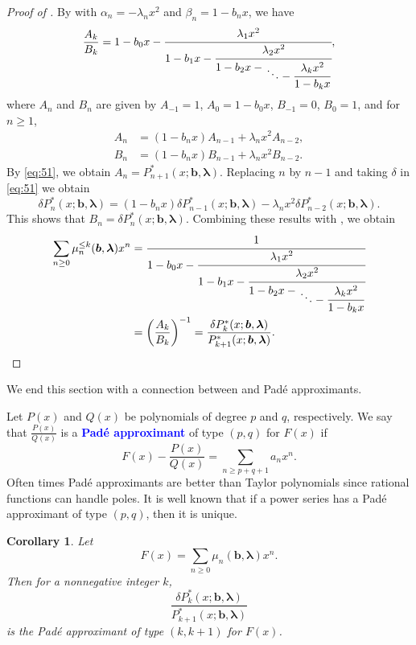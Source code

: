 \documentclass[oneside]{book}
\numberwithin{equation}{section}
\newtheorem{cor}[thm]{Corollary}
\theoremstyle{definition}
\renewcommand\vec[1]{\bm{#1}}
\newcommand\vb{\vec{b}}
\newcommand\vla{\vec{\lambda}}
\renewcommand\emph[1]{\textcolor{blue}{\bf #1}}
\begin{document}
\begin{proof}[Proof of ]
  By  with
  \( \alpha_n = -\lambda_n x^2 \)
  and \( \beta_n = 1-b_nx \), we have
  \[
    \frac{A_k}{B_k} = 1-b_0x- \cfrac{\lambda_1x^2}{ 1-b_1x-
      \cfrac{\lambda_2x^2}{ 1-b_2x-
        \genfrac{}{}{0pt}{1}{}{\displaystyle\ddots -
          \cfrac{\lambda_kx^2}{1-b_kx}}} },
  \]
  where \( A_n \) and \( B_n \) are given by
  \( A_{-1} = 1 \), \( A_0=1-b_0x \),
  \( B_{-1} = 0 \), \( B_0=1 \), and for \( n\ge1 \),
  \begin{align*}
    A_n &= (1-b_nx) A_{n-1} + \lambda_n x^2 A_{n-2},\\
    B_n &= (1-b_nx) B_{n-1} + \lambda_n x^2 B_{n-2}.
  \end{align*}
  By \eqref{eq:51}, we obtain \( A_n = P^*_{n+1}(x;\vb,\vla) \).
  Replacing \( n \) by \( n-1 \) and taking \( \delta \) in \eqref{eq:51} we obtain
  \[
  \delta P^*_{n}(x;\vb,\vla) = (1-b_{n}x) \delta P^*_{n-1}(x;\vb,\vla) - \lambda_{n} x^2  \delta P^*_{n-2}(x;\vb,\vla).
\]
This shows that \( B_n = \delta P^*_n(x;\vb,\vla) \). Combining these
results with , we obtain
\begin{align*}
  \sum_{n\ge0} \mu_n^{\le k}(\vb,\vla)x^n
  &= \cfrac{1}{
    1-b_0x- \cfrac{\lambda_1x^2}{
      1-b_1x- \cfrac{\lambda_2x^2}{
        1-b_2x- \genfrac{}{}{0pt}{1}{}{\displaystyle\ddots -
    \cfrac{\lambda_kx^2}{1-b_kx}}} }}\\
  &= \left(\frac{A_k}{B_k}\right)^{-1} = \frac{\delta P^*_k(x;\vb,\vla)}{P^*_{k+1}(x;\vb,\vla)}.
    \qedhere
\end{align*}
\end{proof}

We end this section with a connection between  and Pad\'e
approximants. 

\medskip

Let \( P(x) \) and \( Q(x) \) be polynomials of degree
\( p \) and \( q \), respectively. We say that \( \frac{P(x)}{Q(x)} \)
is a \emph{Pad\'e approximant} of type \( (p,q) \) for \( F(x) \) if
\[
  F(x) - \frac{P(x)}{Q(x)} = \sum_{n\ge p+q+1} a_n x^n.
\]
Often times Pad\'e approximants are better than Taylor polynomials
since rational functions can handle poles. It is well known that if a
power series has a Pad\'e approximant of type \( (p,q) \), then it is
unique.

\begin{cor}
Let
\[
  F(x) = \sum_{n\ge0} \mu_{n}(\vb,\vla) x^{n}.
\]
Then for a nonnegative integer \( k \),
\[
  \frac{\delta P^*_{k}(x;\vb,\vla)}{P^*_{k+1}(x;\vb,\vla)}
\]
is the Pad\'e approximant of type \( (k,k+1) \) for \( F(x) \).
\end{cor}
\end{document}
